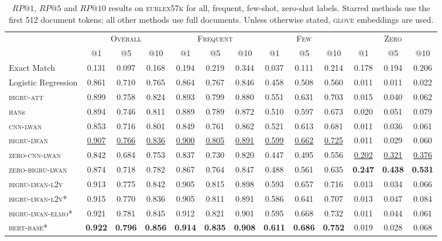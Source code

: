 \documentclass[11pt,a4paper]{article}
\newcommand{\bigruatt}{\textsc{bigru-att}\xspace}
\newcommand{\han}{\textsc{han}\xspace}
\newcommand{\lwancnn}{\textsc{cnn-lwan}\xspace}
\newcommand{\zlwancnn}{\textsc{zero-cnn-lwan}\xspace}
\newcommand{\lwangru}{\textsc{bigru-lwan}\xspace}
\newcommand{\lwangrulv}{\textsc{bigru-lwan-l2v}}
\newcommand{\lwangruelmo}{\textsc{bigru-lwan-elmo}}
\newcommand{\zlwangru}{\textsc{zero-bigru-lwan}\xspace}
\newcommand{\glove}{\textsc{glove}\xspace}
\newcommand{\bertbase}{\textsc{bert-base}\xspace}
\newcommand{\newdata}{\textsc{eurlex57k}\xspace}
\begin{document}
\vspace{-2mm}

\begin{table*}[h!]
\centering
{
\footnotesize\addtolength{\tabcolsep}{-2pt}
\begin{tabular}{lcccccccccccc}
  \hline
  & \multicolumn{3}{c}{\textsc{Overall}} & \multicolumn{3}{c}{\textsc{Frequent}} & \multicolumn{3}{c}{\textsc{Few}} & \multicolumn{3}{c}{\textsc{Zero}} \\ 
  & @1 & @5 & @10 & @1 & @5 & @10 & @1 & @5 & @10 & @1 & @5 & @10 \\
  \cline{2-13}
  Exact Match & 0.131 & 0.097 & 0.168 & 0.194 & 0.219 & 0.344 & 0.037 & 0.111 & 0.214 & 0.178 & 0.194 & 0.206 \\
  Logistic Regression & 0.861 & 0.710 & 0.765 & 0.864 & 0.767 & 0.846 & 0.458 & 0.508 & 0.560 & 0.011 & 0.011 & 0.022 \\
  \hline
  \bigruatt & 0.899 & 0.758 & 0.824 & 0.893 & 0.799 & 0.880 & 0.551 & 0.631 & 0.703 & 0.015 & 0.040 & 0.062 \\
  \han{s} & 0.894 & 0.746 & 0.811 & 0.889 & 0.789 & 0.872 & 0.510 & 0.597 & 0.673 & 0.020 & 0.051 & 0.079 \\
  \hline
 \lwancnn & 0.853 & 0.716 & 0.801 & 0.849 & 0.761 & 0.862 & 0.521 & 0.613 & 0.681 & 0.011 & 0.036 & 0.061 \\
  \lwangru & \underline{0.907} & \underline{0.766} & \underline{0.836} & \underline{0.900} & \underline{0.805} & \underline{0.891} & \underline{0.599} & \underline{0.662} & \underline{0.725} & 0.011 & 0.029 & 0.060 \\
   \hline
  \zlwancnn & 0.842 & 0.684 & 0.753 & 0.837 & 0.730 & 0.820 & 0.447 & 0.495 & 0.556 & \underline{0.202} & \underline{0.321} & \underline{0.376} \\
  \zlwangru & 0.874 & 0.718 & 0.782 & 0.867 & 0.764 & 0.847 & 0.488 & 0.561 & 0.635 & \textbf{0.247} & \textbf{0.438} & \textbf{0.531} \\
  \hline\hline
   \lwangrulv & 0.913 & 0.775 & 0.842 & 0.905 & 0.815 & 0.898 & 0.593 & 0.657 & 0.716 & 0.013 & 0.034 & 0.066 \\
\hline
\lwangrulv* & 0.915 & 0.770 & 0.836 & 0.905 & 0.811 & 0.891 & 0.586 & 0.641 & 0.707 & 0.013 & 0.047 & 0.084 \\
\lwangruelmo* & 0.921 & 0.781 & 0.845 & 0.912 & 0.821 & 0.901 & 0.595 & 0.668 & 0.732 & 0.011 & 0.044 & 0.061 \\
  \bertbase* & \textbf{0.922} & \textbf{0.796} & \textbf{0.856} & \textbf{0.914} & \textbf{0.835} & \textbf{0.908} & \textbf{0.611} & \textbf{0.686} & \textbf{0.752} & 0.019 & 0.028 & 0.068 \\
  \hline
\end{tabular}
}
\caption{$RP@1$, $RP@5$ and $RP@10$ results on \newdata for all, frequent, few-shot, zero-shot labels. Starred methods use the first 512 document tokens; all other methods use full documents. Unless otherwise stated, \glove embeddings are used.}
\label{tab:rpresults}
\end{table*}
\end{document}
